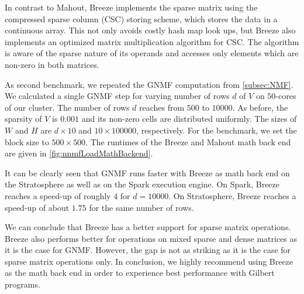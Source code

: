 In contrast to Mahout, Breeze implements the sparse matrix using the compressed sparse column (CSC) storing scheme, which stores the data in a continuous array.
This not only avoids costly hash map look ups, but Breeze also implements an optimized matrix multiplication algorithm for CSC.
The algorithm is aware of the sparse nature of its operands and accesses only elements which are non-zero in both matrices.

As second benchmark, we repeated the GNMF computation from \cref{subsec:NMF}.
We calculated a single GNMF step for varying number of rows $d$ of $V$ on $50$-cores of our cluster.
The number of rows $d$ reaches from $500$ to $10000$.
As before, the sparsity of $V$ is $0.001$ and its non-zero cells are distributed uniformly.
The sizes of $W$ and $H$ are $d\times 10$ and $10 \times 100000$, respectively.
For the benchmark, we set the block size to $500 \times 500$.
The runtimes of the Breeze and Mahout math back end are given in \cref{fig:nnmfLoadMathBackend}.

It can be clearly seen that GNMF runs faster with Breeze as math back end on the Stratosphere as well as on the Spark execution engine.
On Spark, Breeze reaches a speed-up of roughly $4$ for $d=10000$. 
On Stratosphere, Breeze reaches a speed-up of about $1.75$ for the same number of rows.

We can conclude that Breeze has a better support for sparse matrix operations.
Breeze also performs better for operations on mixed sparse and dense matrices as it is the case for GNMF.
However, the gap is not as striking as it is the case for sparse matrix operations only.
In conclusion, we highly recommend using Breeze as the math back end in order to experience best performance with Gilbert programs.


